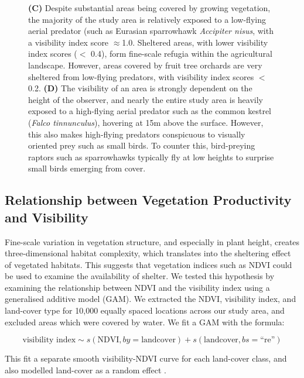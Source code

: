 \begin{figure}
{        \textbf{(C)} Despite substantial areas being covered by growing vegetation, the majority of the study area is relatively exposed to a low-flying aerial predator (such as Eurasian sparrowhawk \textit{Accipiter nisus}, with a visibility index score $\approx$1.0. Sheltered areas, with lower visibility index scores ($<$ 0.4), form fine-scale refugia within the agricultural landscape.
        However, areas covered by fruit tree orchards are very sheltered from low-flying predators, with visibility index scores $<$ 0.2.
        \textbf{(D)} The visibility of an area is strongly dependent on the height of the observer, and nearly the entire study area is heavily exposed to a high-flying aerial predator such as the common kestrel (\textit{Falco tinnunculus}), hovering at 15m above the surface.
        However, this also makes high-flying predators conspicuous to visually oriented prey such as small birds.
        To counter this, bird-preying raptors such as sparrowhawks typically fly at low heights to surprise small birds emerging from cover.
    }
    \label{fig:hula-maps}
\end{figure}

\subsection*{Relationship between Vegetation Productivity and Visibility}

Fine-scale variation in vegetation structure, and especially in plant height, creates three-dimensional habitat complexity, which translates into the sheltering effect of vegetated habitats.
This suggests that vegetation indices such as NDVI could be used to examine the availability of shelter.
We tested this hypothesis by examining the relationship between NDVI and the visibility index using a generalised additive model (GAM).
We extracted the NDVI, visibility index, and land-cover type for 10,000 equally spaced locations across our study area, and excluded areas which were covered by water.
We fit a GAM with the formula: 
\begin{linenomath*}
    $$\text{visibility~index} \sim s(\text{NDVI}, by = \text{landcover}) + s(\text{landcover}, bs = \text{``re''})$$
\end{linenomath*}
This fit a separate smooth visibility-NDVI curve for each land-cover class, and also modelled land-cover as a random effect \cite{wood2017}.


